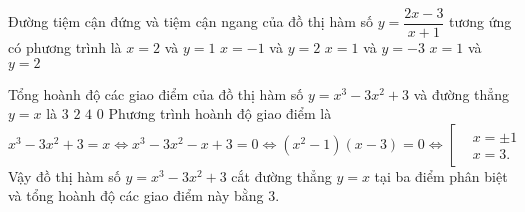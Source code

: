 \begin{ex}%
	Đường tiệm cận đứng và tiệm cận ngang của đồ thị hàm số $y=\dfrac{2x-3}{x+1}$ tương ứng có phương trình là
	\choice
	{$x=2$ và $y=1$}
	{\True $x=-1$ và $y=2$}
	{$x=1$ và $y=-3$}
	{$x=1$ và $y=2$}
\end{ex}
\begin{ex}%
	Tổng hoành độ các giao điểm của đồ thị hàm số $y=x^3-3x^2+3$ và đường thẳng $y=x$ là
	\choice
	{\True $3$}
	{$2$}
	{$4$}
	{$0$}
	\loigiai
	{
		Phương trình hoành độ giao điểm là
		\begin{equation*}
		x^3-3x^2+3 = x \Leftrightarrow x^3 - 3x^2 - x + 3 = 0 \Leftrightarrow (x^2 - 1)(x-3)=0 \Leftrightarrow \left[\begin{aligned} &x=\pm 1 \\& x=3.\end{aligned}\right.
		\end{equation*}
		Vậy đồ thị hàm số $y=x^3-3x^2+3$ cắt đường thẳng $y=x$ tại ba điểm phân biệt và tổng hoành độ các giao điểm này bằng $3$.
	}
\end{ex}
